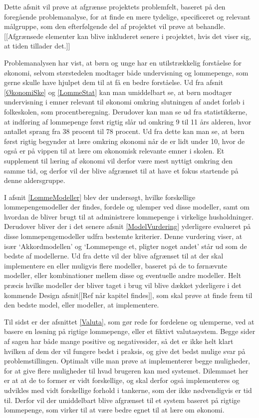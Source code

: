 Dette afsnit vil prøve at afgrænse projektets problemfelt, baseret på den foregående problemanalyse, for at finde en mere tydelige, specificeret og relevant målgruppe, som den efterfølgende del af projektet vil prøve at behandle. [[Afgrænsede elementer kan blive inkluderet senere i projektet, hvis det viser sig, at tiden tillader det.]]

Problemanalysen har vist, at børn og unge har en utilstrækkelig forståelse for økonomi, selvom størstedelen modtager både undervisning og lommepenge, som gerne skulle have hjulpet dem til at få en bedre forståelse. Ud fra afsnit \ref{ØkonomiSke} og \ref{LommeStat}  kan man umiddelbart se, at børn modtager undervisning i emner relevant til økonomi omkring slutningen af andet forløb i folkeskolen, som procentberegning. Derudover kan man se ud fra statistikkerne, at indføring af lommepenge først rigtig slår ud omkring 9 til 11 års alderen, hvor antallet sprang fra 38 procent til 78 procent. Ud fra dette kan man se, at børn først rigtig begynder at lære omkring økonomi når de er lidt under 10, hvor de også er på vippen til at lære om økonomisk relevante emner i skolen. Et supplement til læring af økonomi vil derfor være mest nyttigt omkring den samme tid, og derfor vil der blive afgrænset til at have et fokus startende på denne aldersgruppe.

I afsnit \ref{LommeModeller} blev der undersøgt, hvilke forskellige lommepengemodeller der findes, fordele og ulemper ved disse modeller, samt om hvordan de bliver brugt til at administrere lommepenge i virkelige husholdninger. Derudover bliver der i det senere afsnit \ref{ModelVurdering} yderligere evalueret på disse lommepengemodeller udfra bestemte kriterier. Denne vurdering viser, at især ‘Akkordmodellen’ og ‘Lommepenge et, pligter noget andet’ står ud som de bedste af modellerne. Ud fra dette vil der blive afgrænset til at der skal implementere en eller muligvis flere modeller, baseret på de to førnævnte modeller, eller kombinationer mellem disse og eventuelle andre modeller. Helt præcis hvilke modeller der bliver taget i brug vil blive dækket yderligere i det kommende Design afsnit[[Ref når kapitel findes]], som skal prøve at finde frem til den bedste model, eller modeller, at implementere.

Til sidst er der afsnittet \ref{Valuta}, som gør rede for fordelene og ulemperne, ved at basere en løsning på rigtige lommepenge, eller et fiktivt valutasystem. Begge sider af sagen har både mange positive og negativesider, så det er ikke helt klart hvilken af dem der vil fungere bedst i praksis, og give det bedst mulige svar på problemstillingen. Optimalt ville man prøve at implementerer begge muligheder, for at give flere muligheder til hvad brugeren kan med systemet. Dilemmaet her er at at de to former er vidt forskellige, og skal derfor også implementeres og udvikles med vidt forskellige forhold i tankerne, som der ikke nødvendigvis er tid til. Derfor vil der umiddelbart blive afgrænset til et system baseret på rigtige lommepenge, som virker til at være bedre egnet til at lære om økonomi.